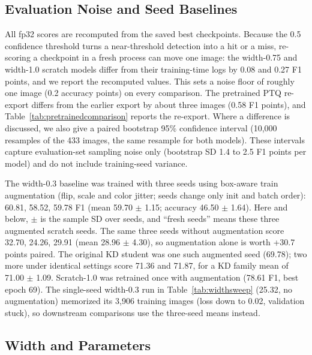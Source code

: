 \documentclass[conference]{IEEEtran}
\begin{document}
	\subsection{Evaluation Noise and Seed Baselines}
	\label{sec:noise}
	
	All fp32 scores are recomputed from the saved best checkpoints. Because the 0.5 confidence threshold turns a near-threshold detection into a hit or a miss, re-scoring a checkpoint in a fresh process can move one image: the width-0.75 and width-1.0 scratch models differ from their training-time logs by 0.08 and 0.27 F1 points, and we report the recomputed values. This sets a noise floor of roughly one image (0.2 accuracy points) on every comparison. The pretrained PTQ re-export differs from the earlier export by about three images (0.58 F1 points), and Table~\ref{tab:pretrainedcomparison} reports the re-export. Where a difference is discussed, we also give a paired bootstrap 95\% confidence interval (10{,}000 resamples of the 433 images, the same resample for both models). These intervals capture evaluation-set sampling noise only (bootstrap SD 1.4 to 2.5 F1 points per model) and do not include training-seed variance.
	
	The width-0.3 baseline was trained with three seeds using box-aware train augmentation (flip, scale and color jitter; seeds change only init and batch order): 60.81, 58.52, 59.78 F1 (mean 59.70 $\pm$ 1.15; accuracy 46.50 $\pm$ 1.64). Here and below, $\pm$ is the sample SD over seeds, and ``fresh seeds'' means these three augmented scratch seeds. The same three seeds without augmentation score 32.70, 24.26, 29.91 (mean 28.96 $\pm$ 4.30), so augmentation alone is worth +30.7 points paired. The original KD student was one such augmented seed (69.78); two more under identical settings score 71.36 and 71.87, for a KD family mean of 71.00 $\pm$ 1.09. Scratch-1.0 was retrained once with augmentation (78.61 F1, best epoch 69). The single-seed width-0.3 run in Table~\ref{tab:widthsweep} (25.32, no augmentation) memorized its 3,906 training images (loss down to 0.02, validation stuck), so downstream comparisons use the three-seed means instead.
	
	\subsection{Width and Parameters}
	\label{sec:width}
	
\end{document}
